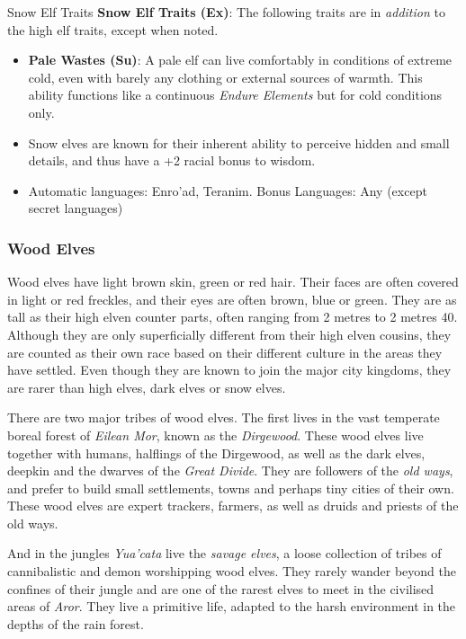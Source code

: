 \begin{35e}{Snow Elf Traits}
  \textbf{Snow Elf Traits (Ex)}: The following traits are in \emph{addition}
  to the high elf traits, except when noted.
  \begin{itemize}[noitemsep]
    \item \textbf{Pale Wastes (Su)}: A pale elf can live comfortably in
      conditions of extreme cold, even with barely any clothing or external
      sources of warmth. This ability functions like a continuous \emph{Endure
      Elements} but for cold conditions only.
    \item Snow elves are known for their inherent ability to perceive hidden
      and small details, and thus have a +2 racial bonus to wisdom.
    \item Automatic languages: Enro'ad, Teranim. Bonus Languages: Any (except
      secret languages)
  \end{itemize}
\end{35e}

\subsubsection*{Wood Elves}
\label{sec:Wood Elves}

Wood elves have light brown skin, green or red hair. Their faces are often
covered in light or red freckles, and their eyes are often brown, blue or
green. They are as tall as their high elven counter parts, often ranging from
2 metres to 2 metres 40. Although they are only superficially different from
their high elven cousins, they are counted as their own race based on their
different culture in the areas they have settled. Even though they are known
to join the major city kingdoms, they are rarer than high elves, dark elves or
snow elves.

There are two major tribes of wood elves. The first lives in the vast
temperate boreal forest of \emph{Eilean Mor}, known as the \emph{Dirgewood}.
These wood elves live together with humans, halflings of the Dirgewood, as
well as the dark elves, deepkin and the dwarves of the \emph{Great Divide}.
They are followers of the \emph{old ways}, and prefer to build small
settlements, towns and perhaps tiny cities of their own. These wood elves are
expert trackers, farmers, as well as druids and priests of the old ways.

And in the jungles \emph{Yua'cata} live the \emph{savage elves}, a loose
collection of tribes of cannibalistic and demon worshipping wood elves. They
rarely wander beyond the confines of their jungle and are one of the rarest
elves to meet in the civilised areas of \emph{Aror}. They live a primitive
life, adapted to the harsh environment in the depths of the rain forest.

